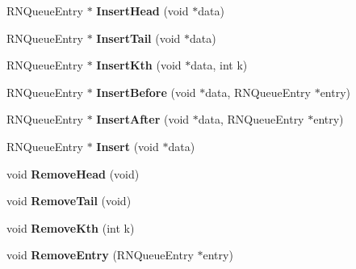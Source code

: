 \begin{DoxyCompactItemize}
\item 
R\+N\+Queue\+Entry $\ast$ {\bfseries Insert\+Head} (void $\ast$data)\hypertarget{class_r_n_v_queue_a89773e2682cc075449a742bbb2ca8965}{}\label{class_r_n_v_queue_a89773e2682cc075449a742bbb2ca8965}

\item 
R\+N\+Queue\+Entry $\ast$ {\bfseries Insert\+Tail} (void $\ast$data)\hypertarget{class_r_n_v_queue_ad518af6cca8c0cef2d92865e2922c685}{}\label{class_r_n_v_queue_ad518af6cca8c0cef2d92865e2922c685}

\item 
R\+N\+Queue\+Entry $\ast$ {\bfseries Insert\+Kth} (void $\ast$data, int k)\hypertarget{class_r_n_v_queue_ac4a28688d1b22c8b892376c346c8d291}{}\label{class_r_n_v_queue_ac4a28688d1b22c8b892376c346c8d291}

\item 
R\+N\+Queue\+Entry $\ast$ {\bfseries Insert\+Before} (void $\ast$data, R\+N\+Queue\+Entry $\ast$entry)\hypertarget{class_r_n_v_queue_a4274fec6e7c6833675980183d5dbe745}{}\label{class_r_n_v_queue_a4274fec6e7c6833675980183d5dbe745}

\item 
R\+N\+Queue\+Entry $\ast$ {\bfseries Insert\+After} (void $\ast$data, R\+N\+Queue\+Entry $\ast$entry)\hypertarget{class_r_n_v_queue_a936085040b016e69ac1490251e1254ef}{}\label{class_r_n_v_queue_a936085040b016e69ac1490251e1254ef}

\item 
R\+N\+Queue\+Entry $\ast$ {\bfseries Insert} (void $\ast$data)\hypertarget{class_r_n_v_queue_a0302cec2c4eaa27f35ccb3107eb66d2b}{}\label{class_r_n_v_queue_a0302cec2c4eaa27f35ccb3107eb66d2b}

\item 
void {\bfseries Remove\+Head} (void)\hypertarget{class_r_n_v_queue_ab3248b9845e981bbc90d2aa3dafa1ee8}{}\label{class_r_n_v_queue_ab3248b9845e981bbc90d2aa3dafa1ee8}

\item 
void {\bfseries Remove\+Tail} (void)\hypertarget{class_r_n_v_queue_a3f210a43c6ab5c0e357f07440559503c}{}\label{class_r_n_v_queue_a3f210a43c6ab5c0e357f07440559503c}

\item 
void {\bfseries Remove\+Kth} (int k)\hypertarget{class_r_n_v_queue_a60e2c364e129677e1d5e5f2ad32d6804}{}\label{class_r_n_v_queue_a60e2c364e129677e1d5e5f2ad32d6804}

\item 
void {\bfseries Remove\+Entry} (R\+N\+Queue\+Entry $\ast$entry)\hypertarget{class_r_n_v_queue_a89d233c9b3b0a266a01076ec950a494b}{}\label{class_r_n_v_queue_a89d233c9b3b0a266a01076ec950a494b}


\end{DoxyCompactItemize}
